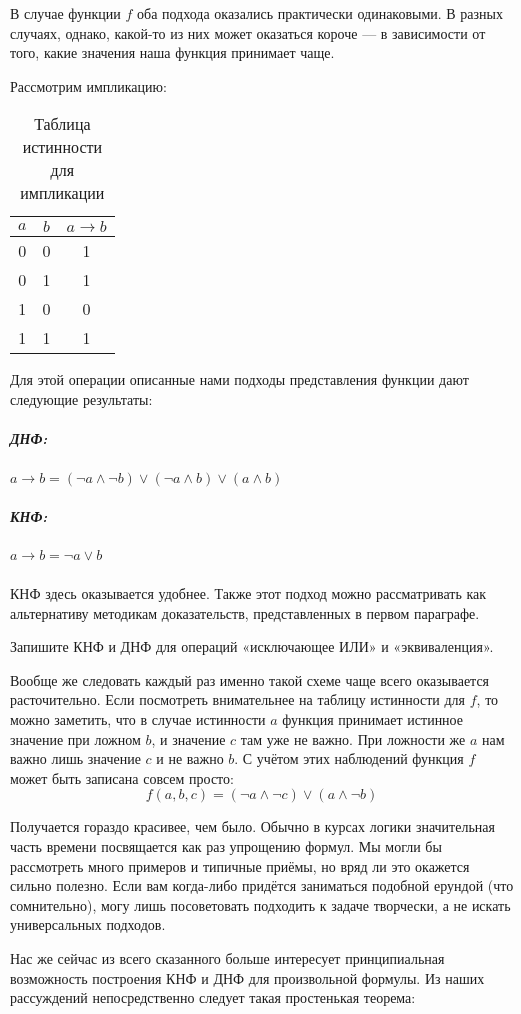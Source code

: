 В случае функции $f$ оба подхода оказались практически одинаковыми. В разных случаях, однако, какой-то из них может оказаться короче --- в зависимости от того, какие значения наша функция принимает чаще.

Рассмотрим импликацию:

\begin{table}[h]
\centering
\begin{tabular}{cc|c}
$a$&$b$&$a\rightarrow b$\\
\hline
0&0&1 \\
0&1&1 \\
1&0&0 \\
1&1&1
\end{tabular}
\caption{Таблица истинности для импликации}
\end{table}

Для этой операции описанные нами подходы представления функции дают следующие результаты:

\subparagraph{ДНФ:} $a \rightarrow b = (\neg a\land \neg b)\lor(\neg a \land b)\lor(a\land b)$

\subparagraph{КНФ:} $a\rightarrow b = \neg a \lor b$

\subparagraph{} КНФ здесь оказывается удобнее. Также этот подход можно рассматривать как альтернативу методикам доказательств, представленных в первом параграфе.

\begin{exercise} Запишите КНФ и ДНФ для операций «исключающее ИЛИ» и «эквиваленция».\end{exercise}

Вообще же следовать каждый раз именно такой схеме чаще всего оказывается расточительно. Если посмотреть вни\-ма\-тельнее на таблицу истинности для $f$, то можно заметить, что в случае истинности $a$ функция принимает истинное значение при ложном $b$, и значение $c$ там уже не важно. При ложности же $a$ нам важно лишь значение $c$ и не важно $b$. С учётом этих наблюдений функция $f$ может быть записана совсем просто: $$f(a, b, c) = (\neg a\land \neg c) \lor (a \land \neg b)$$

Получается гораздо красивее, чем было. Обычно в курсах логики значительная часть времени посвящается как раз упрощению формул. Мы могли бы рассмотреть много примеров и типичные приёмы, но вряд ли это окажется сильно полезно. Если вам когда-либо придётся заниматься подобной ерундой (что сомнительно), могу лишь посоветовать подходить к задаче творчески, а не искать универсальных подходов.

Нас же сейчас из всего сказанного больше интересует принципиальная возможность построения КНФ и ДНФ для произвольной формулы. Из наших рассуждений непосредственно следует такая простенькая теорема:

